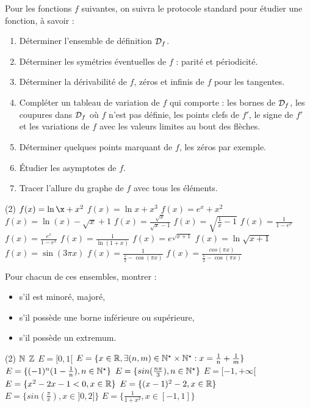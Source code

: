 \begin{exercise}[subtitle= Étude de fonctions, difficulty=*]
Pour les fonctions $f$ suivantes, on suivra le protocole standard pour étudier une fonction, à savoir :
\begin{enumerate}
	\item Déterminer l'ensemble de définition $\mathcal{D}_f$.
	\item Déterminer les symétries éventuelles de $f$ : parité et périodicité.
	\item Déterminer la dérivabilité de $f$,  zéros et infinis de $f$ pour les tangentes.
	\item Compléter un tableau de variation de $f$ qui comporte : les bornes de $\mathcal{D}_f$, les coupures dans $\mathcal{D}_f$ où $f$ n'est pas définie, les points clefs de $f'$, le signe de $f'$ et les variations de $f$ avec les valeurs limites au bout des flèches.
	\item Déterminer quelques points marquant de $f$, les zéros par exemple.
	\item Étudier les asymptotes de $f$.
	\item Tracer l'allure du graphe de $f$ avec tous les éléments.
\end{enumerate}
	\begin{tasks}(2)
		\task $f(x)= \ln{\x}+x^2$
		\task $f(x)= \ln{x}+x^3$
		\task $f(x)= e^{x}+x^2$
		\task $f(x)= \ln(x)-\sqrt{x}+1$
		\task $f(x)= \frac{\sqrt{x}}{\sqrt{x}-1}$
		\task $f(x)= \sqrt{\frac{1}{x}-1}$
		\task $f(x)= \frac{1}{1-e^x}$
	    \task $f(x)= \frac{e^x}{1-e^x}$
		\task $f(x)= \frac{1}{\ln(1+x)}$
		\task $f(x)= e^{\sqrt{x+1}}$
	    \task $f(x)= \ln{\sqrt{x+1}}$
	    \task $f(x)= \sin(3 \pi x)$
	    \task $f(x)= \frac{1}{\frac{1}{2}-\cos(\pi x)}$
	    \task $f(x)= \frac{cos(\pi x)}{\frac{1}{2}-\cos(\pi x)}$
	\end{tasks}
\end{exercise}



\begin{exercise}[subtitle= Extrema de fonctions, difficulty=*]
	Pour chacun de ces ensembles, montrer :
	\begin{itemize}
		\item s'il est minoré, majoré,
		\item s'il possède une borne inférieure ou supérieure, 
		\item  s'il possède un extremum.
	\end{itemize}
	\begin{tasks}(2)
		\task $\mathbb{N}$
		\task $\mathbb{Z}$
		\task $E = [0,1[$
		\task $E = \{ x \in \mathbb{R}, \exists (n,m) \in \mathbb{N}^\star \times \mathbb{N}^\star : x=\frac{1}{n} + \frac{1}{m} \}$
		\task $E = \{(-1)^n(1-\frac{1}{n}), n \in \mathbb{N}^\star \}$
		\task $E = \{sin(\frac{n \pi}{3}), n \in \mathbb{N}^\star \}$
		\task $E = [-1,+\infty[$
		\task $E = \{x^2 - 2x -1 <0, x \in \mathbb{R} \}$
		\task $E = \{(x-1)^2-2, x \in \mathbb{R} \}$
	    \task $E = \{sin(\frac{\pi}{x}), x \in ]0,2] \}$
	    \task $E = \{\frac{1}{1+x^2}, x \in [-1,1] \}$
	\end{tasks}
\end{exercise}


